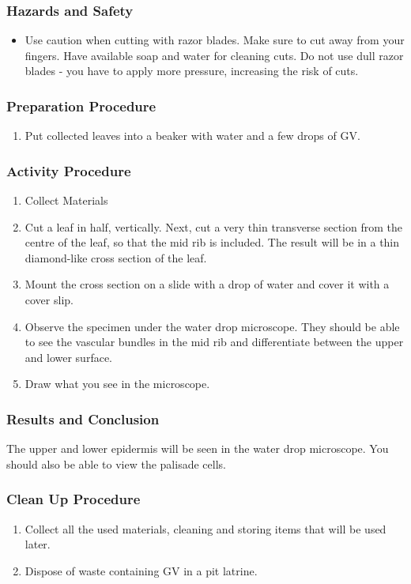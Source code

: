 \subsubsection*{Hazards and Safety}
\begin{itemize}
\item{Use caution when cutting with razor blades. Make sure to cut away from your fingers. Have available soap and water for cleaning cuts. Do not use dull razor blades - you have to apply more pressure, increasing the risk of cuts.}
\end{itemize}

\subsubsection*{Preparation Procedure}
\begin{enumerate}
\item{Put collected leaves into a beaker with water and a few drops of GV.}
\end{enumerate}

\subsubsection*{Activity Procedure}
\begin{enumerate}
\item{Collect Materials}
\item{Cut a leaf in half, vertically. Next, cut a very thin transverse section from the centre of the leaf, so that the mid rib is included. The result will be in a thin diamond-like cross section of the leaf.}
\item{Mount the cross section on a slide with a drop of water and cover it with a cover slip.}
\item{Observe the specimen under the water drop microscope. They should be able to see the vascular bundles in the mid rib and differentiate between the upper and lower surface.}
\item{Draw what you see in the microscope.}
\end{enumerate}

\subsubsection*{Results and Conclusion}
The upper and lower epidermis will be seen in the water drop microscope. You should also be able to view the palisade cells.

\subsubsection*{Clean Up Procedure}
\begin{enumerate}
\item{Collect all the used materials, cleaning and storing items that will be used later.}
\item{Dispose of waste containing GV in a pit latrine.}
\end{enumerate}

